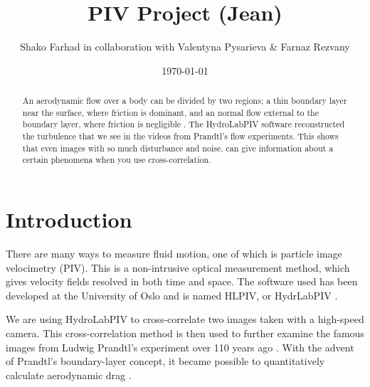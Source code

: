 \documentclass[english,a4paper,12pt]{article}
\title{PIV Project (Jean)}
\author{Shako Farhad in collaboration with Valentyna Pysarieva \& Farnaz Rezvany}
\date{\today}
\begin{document}
 
 
\lstset{style=mystyle}

\maketitle

\begin{abstract}
An aerodynamic flow over a body can be divided by two regions; a thin boundary layer near the surface, where friction is dominant, and an normal flow external to the boundary layer, where friction is negligible \cite{Luddy}. The HydroLabPIV software reconstructed the turbulence that we see in the videos from Prandtl's flow experiments. This shows that even images with so much disturbance and noise, can give information about a certain phenomena when you use cross-correlation.
\end{abstract}

\section*{Introduction}
There are many ways to measure fluid motion, one of which is particle image velocimetry (PIV). This is a
non-intrusive optical measurement method, which gives velocity fields resolved in both time and space. The software used has been developed at the University of Oslo and is named HLPIV, or HydrLabPIV \cite{HLPIV}. \\ \bigskip 

We are using HydroLabPIV to cross-correlate two images taken with a high-speed camera. This cross-correlation method is then used to further examine the famous images from Ludwig Prandtl's experiment over 110 years ago \cite{Prandtl}. With the advent of Prandtl's boundary-layer concept, it became possible to quantitatively calculate aerodynamic drag \cite{Luddy}.
\end{document}
